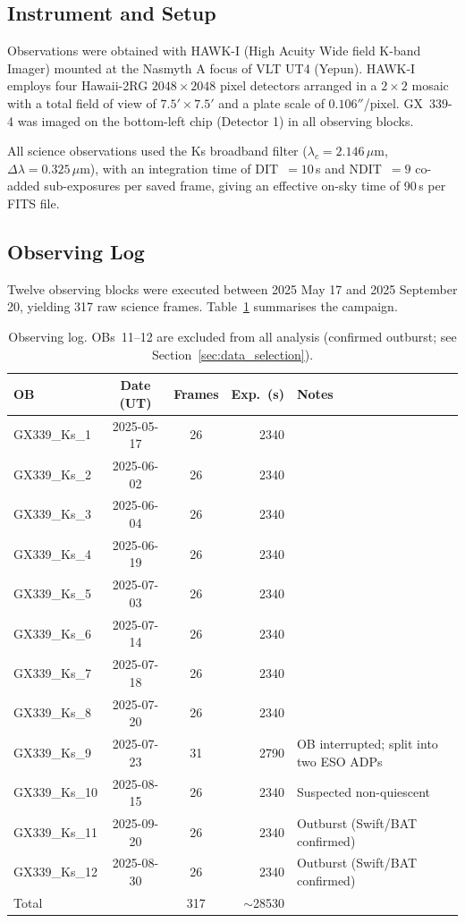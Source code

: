 \documentclass[12pt,a4paper]{article}
\begin{document}
\subsection{Instrument and Setup}

Observations were obtained with HAWK-I (High Acuity Wide field K-band Imager)
mounted at the Nasmyth A focus of VLT UT4 (Yepun). HAWK-I employs four
Hawaii-2RG $2048 \times 2048$ pixel detectors arranged in a $2 \times 2$
mosaic with a total field of view of $7.5' \times 7.5'$ and a plate scale of
$0.106''$/pixel. GX~339-4 was imaged on the bottom-left chip (Detector 1) in
all observing blocks.

All science observations used the Ks broadband filter ($\lambda_c =
2.146\,\mu$m, $\Delta\lambda = 0.325\,\mu$m), with an integration time of
DIT~$= 10$\,s and NDIT~$= 9$ co-added sub-exposures per saved frame, giving
an effective on-sky time of 90\,s per FITS file.

\subsection{Observing Log}

Twelve observing blocks were executed between 2025 May 17 and 2025 September 20,
yielding 317 raw science frames. Table~\ref{tab:obs_log} summarises the
campaign.

\begin{table}[H]
\centering
\caption{Observing log. OBs~11--12 are excluded from all analysis
(confirmed outburst; see Section~\ref{sec:data_selection}).}
\label{tab:obs_log}
\begin{tabular}{lccrl}
\toprule
OB & Date (UT) & Frames & Exp.\ (s) & Notes \\
\midrule
GX339\_Ks\_1  & 2025-05-17 & 26 & 2340 & \\
GX339\_Ks\_2  & 2025-06-02 & 26 & 2340 & \\
GX339\_Ks\_3  & 2025-06-04 & 26 & 2340 & \\
GX339\_Ks\_4  & 2025-06-19 & 26 & 2340 & \\
GX339\_Ks\_5  & 2025-07-03 & 26 & 2340 & \\
GX339\_Ks\_6  & 2025-07-14 & 26 & 2340 & \\
GX339\_Ks\_7  & 2025-07-18 & 26 & 2340 & \\
GX339\_Ks\_8  & 2025-07-20 & 26 & 2340 & \\
GX339\_Ks\_9  & 2025-07-23 & 31 & 2790 & OB interrupted; split into two ESO ADPs \\
GX339\_Ks\_10 & 2025-08-15 & 26 & 2340 & Suspected non-quiescent \\
GX339\_Ks\_11 & 2025-09-20 & 26 & 2340 & Outburst (Swift/BAT confirmed) \\
GX339\_Ks\_12 & 2025-08-30 & 26 & 2340 & Outburst (Swift/BAT confirmed) \\
\midrule
Total & & 317 & $\sim$28530 & \\
\bottomrule
\end{tabular}
\end{table}
\end{document}
